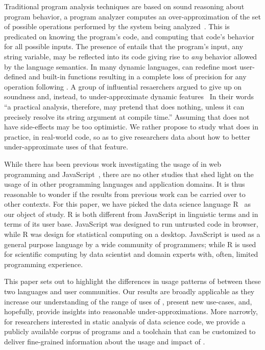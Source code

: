 \documentclass[conference]{IEEEtran}
\begin{document}
Traditional program analysis techniques are based on sound reasoning about
program behavior, a program analyzer computes an over-approximation of the
set of possible operations performed by the system being
analyzed~\cite{cc77}.  This is predicated on knowing the program's code, and
computing that code's behavior for all possible inputs. The presence of
\eval entails that the program's input, any string variable, may be
reflected into its code giving rise to \emph{any} behavior allowed by the
language semantics. In many dynamic languages, \eval can redefine most
user-defined and built-in functions resulting in a complete loss of
precision for any operation following \eval. A group of influential
resaerchers argued to give up on soundness and, instead, to
under-approximate dynamic features~\cite{soundy} In their words ``a
practical analysis, therefore, may pretend that \eval does nothing, unless
it can precisely resolve its string argument at compile time.''  Assuming
that \eval does not have side-effects may be too optimistic. We rather
propose to study what \eval does in practice, in real-world code, so as to
give researchers data about how to better under-approximate uses of that
feature.

While there has been previous work investigating the usage of \eval in web
programming and JavaScript~\cite{ecoop11}, there are no other studies that
shed light on the usage of \eval in other programming languages and
application domains.  It is thus reasonable to wonder if the results from
previous work can be carried over to other contexts. For this paper, we have
picked the data science language R~\cite{r} as our object of study. R is
both different from JavaScript in linguistic terms and in terms of its user
base. JavaScript was designed to run untrusted code in browser, while R was
design for statistical computing on a desktop. JavaScript is used as a
general purpose language by a wide community of programmers; while R is used
for scientific computing by data scientist and domain experts with, often,
limited programming experience.

This paper sets out to highlight the differences in usage patterns of \eval
between these two languages and user communities. Our results are broadly
applicable as they increase our understanding of the range of uses of \eval,
present new use-cases, and, hopefully, provide insights into reasonable
under-approximations. More narrowly, for researchers interested in static
analysis of data science code, we provide a publicly available corpus of
programs and a toolchain that can be customized to deliver fine-grained
information about the usage and impact of \eval.
\end{document}
